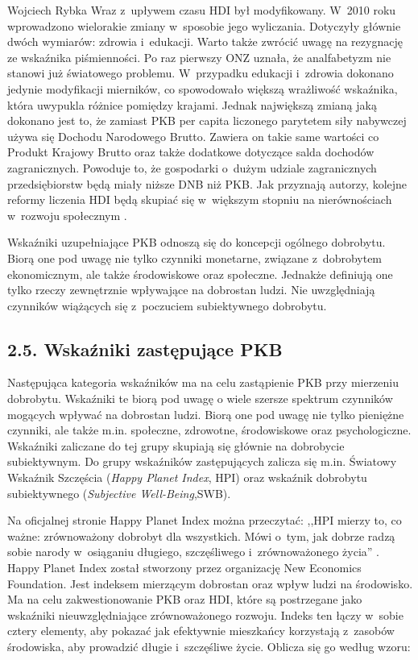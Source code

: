 \begin{artplenv}{Wojciech Rybka}
Wraz z~upływem czasu HDI był modyfikowany. W~2010 roku wprowadzono wielorakie zmiany w~sposobie jego wyliczania.
Dotyczyły głównie dwóch wymiarów: zdrowia i~edukacji. Warto także zwrócić uwagę na rezygnację ze wskaźnika
piśmienności. Po raz pierwszy ONZ uznała, że analfabetyzm nie stanowi już światowego problemu. W~przypadku
edukacji i~zdrowia dokonano jedynie modyfikacji mierników, co spowodowało większą wrażliwość wskaźnika, która uwypukla różnice
pomiędzy krajami. Jednak największą zmianą jaką dokonano jest to, że zamiast PKB per capita liczonego parytetem siły
nabywczej używa się Dochodu Narodowego Brutto. Zawiera on takie same wartości co Produkt Krajowy Brutto oraz także
dodatkowe dotyczące salda dochodów zagranicznych. Powoduje to, że gospodarki o~dużym udziale zagranicznych
przedsiębiorstw będą miały niższe DNB niż PKB. Jak przyznają autorzy, kolejne reformy liczenia HDI będą skupiać
się w~większym stopniu na nierównościach w~rozwoju społecznym
\parencite{antczak_nowe_2012}.

\enlargethispage{1\baselineskip}

Wskaźniki uzupełniające PKB odnoszą się do koncepcji ogólnego dobrobytu. Biorą one pod uwagę nie tylko czynniki
monetarne, związane z~dobrobytem ekonomicznym, ale także środowiskowe oraz społeczne. Jednakże definiują one tylko
rzeczy zewnętrznie wpływające na dobrostan ludzi. Nie uwzględniają czynników wiążących się z~poczuciem subiektywnego
dobrobytu.

\subsection{2.5. Wskaźniki zastępujące PKB}
Następująca kategoria wskaźników ma na celu zastąpienie PKB przy mierzeniu dobrobytu. Wskaźniki te biorą pod uwagę o
wiele szersze spektrum czynników mogących wpływać na dobrostan ludzi. Biorą one pod uwagę nie tylko pieniężne czynniki,
ale także m.in. społeczne, zdrowotne, środowiskowe oraz psychologiczne. Wskaźniki zaliczane do tej grupy skupiają się
głównie na dobrobycie subiektywnym. Do grupy wskaźników zastępujących zalicza się m.in. Światowy Wskaźnik Szczęścia
(\textit{Happy Planet Index}, HPI) oraz wskaźnik dobrobytu subiektywnego (\textit{Subjective Well-Being},SWB).

Na oficjalnej stronie Happy Planet Index można przeczytać: ,,HPI mierzy to, co ważne: zrównoważony dobrobyt dla
wszystkich. Mówi o~tym, jak dobrze radzą sobie narody w~osiąganiu długiego, szczęśliwego i~zrównoważonego życia''
\parencite{noauthor_about_2019}.
Happy Planet Index został stworzony przez organizację New Economics
Foundation. Jest indeksem mierzącym dobrostan oraz wpływ ludzi na środowisko. Ma na celu zakwestionowanie PKB oraz HDI,
które są postrzegane jako wskaźniki nieuwzględniające zrównoważonego rozwoju. Indeks ten łączy w~sobie cztery elementy,
aby pokazać jak efektywnie mieszkańcy korzystają z~zasobów środowiska, aby prowadzić długie i~szczęśliwe życie. Oblicza
się go według wzoru:


\end{artplenv}
